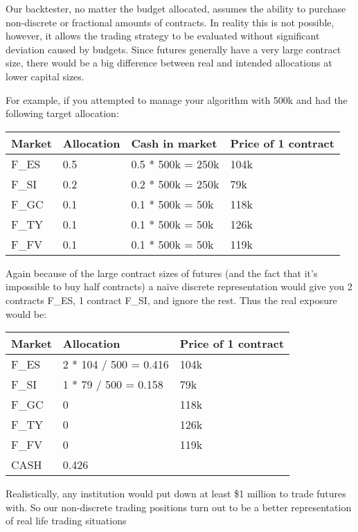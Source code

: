 \documentclass[letterpaper,10pt,english]{sphinxmanual}
\begin{document}
Our backtester, no matter the budget allocated, assumes the ability to purchase non-discrete or fractional amounts of contracts. In reality this is not possible, however, it allows the trading strategy to be evaluated without significant deviation caused by budgets. Since futures generally have a very large contract size, there would be a big difference between real and intended allocations at lower capital sizes.

For example, if you attempted to manage your algorithm with 500k and had the following target allocation:

\noindent\begin{tabulary}{\linewidth}{|L|L|L|L|}
\hline
\textsf{\relax 
Market
\unskip}\relax &\textsf{\relax 
Allocation
\unskip}\relax &\textsf{\relax 
Cash in market
\unskip}\relax &\textsf{\relax 
Price of 1 contract
\unskip}\relax \\
\hline
F\_ES
&
0.5
&
0.5 * 500k = 250k
&
104k
\\
\hline
F\_SI
&
0.2
&
0.2 * 500k = 250k
&
79k
\\
\hline
F\_GC
&
0.1
&
0.1 * 500k = 50k
&
118k
\\
\hline
F\_TY
&
0.1
&
0.1 * 500k = 50k
&
126k
\\
\hline
F\_FV
&
0.1
&
0.1 * 500k = 50k
&
119k
\\
\hline\end{tabulary}


Again because of the large contract sizes of futures (and the fact that it's impossible to buy half contracts) a naïve discrete representation would give you 2 contracts F\_ES, 1 contract F\_SI, and ignore the rest. Thus the real exposure would be:

\noindent\begin{tabulary}{\linewidth}{|L|L|L|}
\hline
\textsf{\relax 
Market
\unskip}\relax &\textsf{\relax 
Allocation
\unskip}\relax &\textsf{\relax 
Price of 1 contract
\unskip}\relax \\
\hline
F\_ES
&
2 * 104 / 500 = 0.416
&
104k
\\
\hline
F\_SI
&
1 * 79 / 500 = 0.158
&
79k
\\
\hline
F\_GC
&
0
&
118k
\\
\hline
F\_TY
&
0
&
126k
\\
\hline
F\_FV
&
0
&
119k
\\
\hline
CASH
&
0.426
&\\
\hline\end{tabulary}


Realistically, any institution would put down at least \$1 million to trade futures with. So our non-discrete trading positions turn out to be a better representation of real life trading situations
\end{document}
